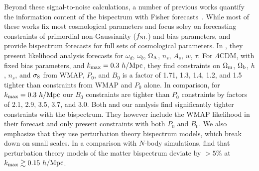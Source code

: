 Beyond these signal-to-noise calculations, a number of previous works 
quantify the information content of the bispectrum with Fisher 
forecasts~\citep{scoccimarro2004, sefusatti2006, sefusatti2007, song2015, tellarini2016, yamauchi2017a, karagiannis2018, yankelevich2019}. 
While most of these works fix most cosmological parameters and focus soley 
on forecasting constraints of primordial non-Gaussianity ($f_{\rm NL}$) and 
bias parameters, \cite{sefusatti2006} and \cite{yankelevich2019} provide 
bispectrum forecasts for full sets of cosmological parameters. In \cite{sefusatti2006}, 
they present likelihood analysis forecasts for $\omega_d$, $\omega_b$, $\Omega_\Lambda$, 
$n_s$, $A_s$, $w$, $\tau$. %
For $\Lambda$CDM, with fixed bias parameters, and $k_{\rm max} = 0.3~h/{\rm Mpc}$, 
they find constraints on $\Omega_{\rm m}$, $\Omega_{\rm b}$, $h$, $n_s$, and $\sigma_8$ from WMAP, 
$P_0$, and $B_0$ is a factor of 1.71, 1.3, 1.4, 1.2, and 1.5 tighter 
than constraints from WMAP and $P_0$ alone. In comparison, for 
$k_{\rm max} = 0.3~h/{\rm Mpc}$ our $B_0$ constraints are tighter than $P_0$ constraints 
by factors of 2.1, 2.9, 3.5, 3.7, and 3.0. Both \cite{sefusatti2006} and our 
analysis find significantly tighter constraints with the bispectrum. They 
however include the WMAP likelihood in their forecast and only present 
constraints with both $P_0$ and $B_0$. We also emphasize that they use 
perturbation theory bispectrum models, which break down on small scales. 
In a comparison with $N$-body simulations, \cite{lazanu2016} find that 
perturbation theory models of the matter bispectrum deviate by $>5\%$ 
at $k_{\rm max} \gtrsim 0.15~h/{\rm Mpc}$. 

